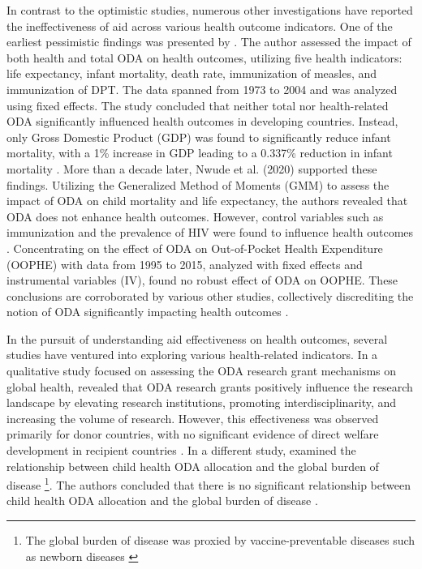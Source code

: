 In contrast to the optimistic studies, numerous other investigations have reported the ineffectiveness of aid across various health outcome indicators. One of the earliest pessimistic findings was presented by \textcite{williamson_foreign_2008}. The author assessed the impact of both health and total ODA on health outcomes, utilizing five health indicators: life expectancy, infant mortality, death rate, immunization of measles, and immunization of DPT. The data spanned from 1973 to 2004 and was analyzed using fixed effects. The study concluded that neither total nor health-related ODA significantly influenced health outcomes in developing countries. Instead, only Gross Domestic Product (GDP) was found to significantly reduce infant mortality, with a 1\% increase in GDP leading to a 0.337\% reduction in infant mortality \parencite{williamson_foreign_2008}. More than a decade later, Nwude et al. (2020) supported these findings. Utilizing the Generalized Method of Moments (GMM) to assess the impact of ODA on child mortality and life expectancy, the authors revealed that ODA does not enhance health outcomes. However, control variables such as immunization and the prevalence of HIV were found to influence health outcomes \parencite{nwude_official_2020}. Concentrating on the effect of ODA on Out-of-Pocket Health Expenditure (OOPHE) with data from 1995 to 2015, analyzed with fixed effects and instrumental variables (IV), \textcite{ali_foreign_2020} found no robust effect of ODA on OOPHE. These conclusions are corroborated by various other studies, collectively discrediting the notion of ODA significantly impacting health outcomes \parencite{bavinger_relationship_2017, chung_economic_2022, rosala-hallas_global_2018, toseef_how_2019}.

In the pursuit of understanding aid effectiveness on health outcomes, several studies have ventured into exploring various health-related indicators. In a qualitative study focused on assessing the ODA research grant mechanisms on global health, \textcite{cassola_evaluating_2022} revealed that ODA research grants positively influence the research landscape by elevating research institutions, promoting interdisciplinarity, and increasing the volume of research. However, this effectiveness was observed primarily for donor countries, with no significant evidence of direct welfare development in recipient countries \parencite{cassola_evaluating_2022}. In a different study, \textcite{bavinger_relationship_2017} examined the relationship between child health ODA allocation and the global burden of disease \footnote{The global burden of disease was proxied by vaccine-preventable diseases such as newborn diseases \parencite{bavinger_relationship_2017}}. The authors concluded that there is no significant relationship between child health ODA allocation and the global burden of disease \parencite{bavinger_relationship_2017}.

